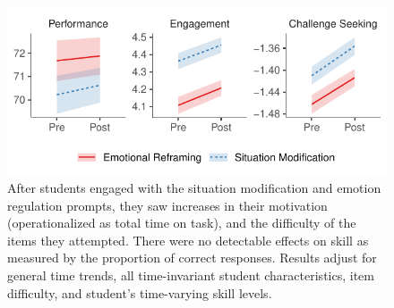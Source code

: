 \documentclass[11pt]{report}
\begin{document}
\begin{mainf}
\begin{figure}
    \centering
    \includegraphics[width=\linewidth]{main.pdf}
    \caption{After students engaged with the situation modification and emotion regulation prompts, they saw increases in their motivation (operationalized as total time on task), and the difficulty of the items they attempted. 
    There were no detectable effects on skill as measured by the proportion of correct responses. 
    Results adjust for general time trends, all time-invariant student characteristics, item difficulty, and student's time-varying skill levels.}
    \label{fig:main}
\end{figure}


\end{mainf}
\end{document}
